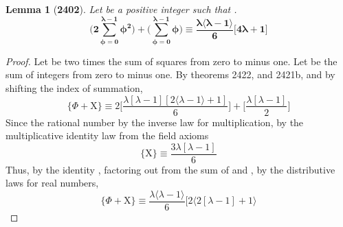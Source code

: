 \documentclass[preview]{standalone}
\newtheorem*{lemma*}{Lemma}
\begin{document}
\begin{lemma*}[\textbf{2402}]
    Let \bm{$\iota$} be a positive integer such that
    \bm{$\big \lfloor \sqrt{\iota} \big \rfloor = \lambda$}.
    \begin{equation*}
        \bm{
            \Bigg( 2\sum_{\phi=0}^{\lambda - 1} \phi ^2 \Bigg)
                + 
            \Bigg( \sum_{\phi=0}^{\lambda - 1} \phi \Bigg)
                \equiv
            \frac{
                \lambda
                \big \langle \lambda - 1 \big \rangle
            }
            {6}
            \Bigg[
                4 \lambda + 1
            \Bigg]
        }
    \end{equation*}
\end{lemma*}

\begin{proof}
    Let \bm{$\Phi$} be two times the sum of squares from zero to \bm{$\lambda$} minus one.
    Let  be the sum of integers from zero to \bm{$\lambda$} minus one.
    By theorems 2422, and 2421b, and by shifting the index of summation,
    \begin{equation*}
        \Bigg\{
            \Phi + \mathrm{X}
        \Bigg\}
            \equiv
        2
        \Bigg[
            \frac{ 
                \lambda [ \lambda - 1 ]
                [ 2 \langle \lambda - 1 \rangle + 1 ] 
            }
            {6}
        \Bigg]
            +
        \Bigg[
            \frac{\lambda [ \lambda - 1 ] }
            {2}
        \Bigg]
    \end{equation*}
    Since the rational number 
    by the inverse law for multiplication,
    by the multiplicative identity law from the field axioms
    \begin{equation*}
        \bigg \{ \mathrm{X} \bigg\}   
            \equiv
        \frac{
            3
            \lambda [ \lambda - 1 ]
        }
        {6}
    \end{equation*}
    Thus, 
    by the identity , 
    factoring
    out from the sum of \bm{$\Phi$} and , 
    by the distributive laws for real numbers,
    \begin{equation*}
        \Bigg\{
            \Phi
                +
            \mathrm{X}
        \Bigg\}
            \equiv
        \frac{
            \lambda
            \big \langle \lambda - 1 \big \rangle
        }
        {6}
        \Bigg[
            2 \bigg \langle 2 [ \lambda - 1 ] + 1 \bigg \rangle

\end{equation*}
\end{proof}
\end{document}

